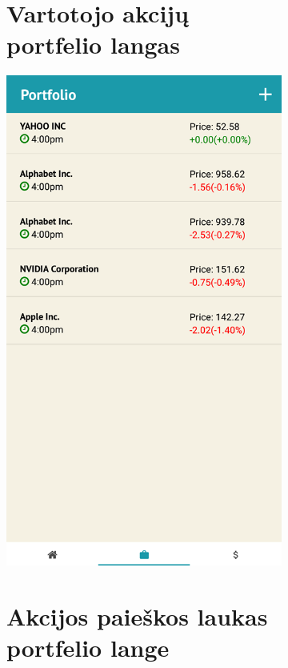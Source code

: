\documentclass[a4paper,12pt,fleqn]{article}
\begin{document}
\begin{appendices}
\begin{figure}
	\begin{subfigure}{0.5\textwidth}
		\centering
		\tocless\section{Vartotojo akcijų portfelio langas}\label{app:priedas5}
		\includegraphics[width=0.8\linewidth]{portfolio.png}
	\end{subfigure}%
	\begin{subfigure}{0.5\textwidth}
		\centering
		\tocless\section{Akcijos paieškos laukas portfelio lange}

\end{subfigure}
\end{figure}
\end{appendices}
\end{document}
